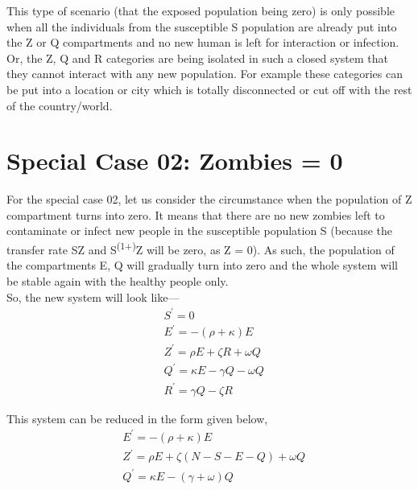 This type of scenario (that the exposed population being zero) is only possible when all the individuals from the susceptible S population are already put into the Z or Q compartments and no new human is left for interaction or infection. \\

Or, the Z, Q and R categories are being isolated in such a closed system that they cannot interact with any new population. For example these categories can be put into a location or city which is totally disconnected or cut off with the rest of the country/world.  \\

\pagebreak
\section{Special Case 02: Zombies = 0}

For the special case 02, let us consider the circumstance when the population of Z compartment turns into zero. It means that there are no new zombies left to contaminate or infect new people in the susceptible population S (because the transfer rate \textbeta SZ and \textalpha S\textsuperscript{(1+\textmu)}Z will be zero, as Z = 0). As such, the population of the compartments E, Q  will gradually turn into zero and the whole system will be stable again with the healthy people only. \\

So, the new system will look like--- \\

\begin{equation}
\begin{aligned}
&S^{\prime}=0 \\
&E^{\prime}=-(\rho+\kappa) E \\
&Z^{\prime}=\rho E+\zeta R+\omega Q \\
&Q^{\prime}=\kappa E-\gamma Q-\omega Q \\
&R^{\prime}=\gamma Q-\zeta R
\end{aligned}
\end{equation}

This system can be reduced in the form given below, \\

\begin{equation}
\begin{aligned}
&E^{\prime}=-(\rho+\kappa) E \\
&Z^{\prime}=\rho E+\zeta (N - S - E - Q)+\omega Q \\
&Q^{\prime}=\kappa E- (\gamma + \omega) Q \\
\end{aligned}
\end{equation}

